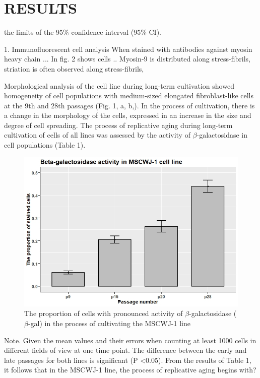 \documentclass[english,authoryear]{elsarticle}
\begin{document}
\section{RESULTS}

the limits of the 95\% confidence interval (95\% CI).

1. Immunofluorescent cell analysis
When stained with antibodies against myosin heavy chain ...
In fig. 2 shows cells ..
Myosin-9 is distributed along stress-fibrils, striation is often observed along stress-fibrils,

Morphological analysis of the cell line during long-term cultivation showed homogeneity of cell populations with medium-sized elongated fibroblast-like cells at the 9th and 28th passages (Fig. 1, a, b,). In the process of cultivation, there is a change in the morphology of the cells, expressed in an increase in the size and degree of cell spreading.
The process of replicative aging during long-term cultivation of cells of all lines was assessed by the activity of $\beta$-galactosidase in cell populations (Table 1).


\begin{figure}[hbt!]
\centering
\includegraphics[width=0.5\linewidth]{fig0.jpeg}
\caption{The proportion of cells with pronounced activity of $\beta$-galactosidase ($\beta$-gal)
 in the process of cultivating the MSCWJ-1 line}
\label{fig:tab}
\end{figure}

Note. Given the mean values and their errors when counting at least 1000 cells in different fields of view at one time point. The difference between the early and late passages for both lines is significant (P <0.05).
  From the results of Table 1, it follows that in the MSCWJ-1 line, the process of replicative aging begins with?
\end{document}
